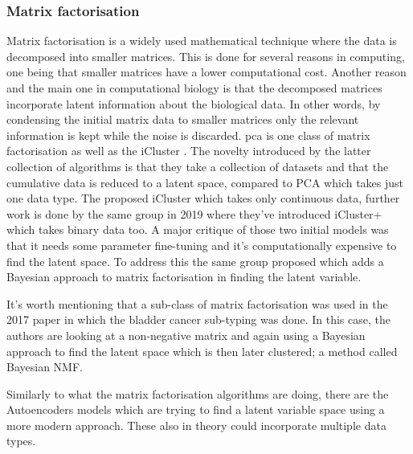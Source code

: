 \subsubsection{Matrix factorisation}
Matrix factorisation is a widely used mathematical technique where the data is decomposed into smaller matrices. This is done for several reasons in computing, one being that smaller matrices have a lower computational cost. Another reason and the main one in computational biology is that the decomposed matrices incorporate latent information about the biological data. In other words, by condensing the initial matrix data to smaller matrices only the relevant information is kept while the noise is discarded. \acrlong{pca} is one class of matrix factorisation as well as the iCluster \cite{Shen2009-ew, Mo2013-zi, Mo2018-el}. The novelty introduced by the latter collection of algorithms is that they take a collection of datasets and that the cumulative data is reduced to a latent space, compared to PCA which takes just one data type. The \citet{Shen2009-ew} proposed iCluster which takes only continuous data, further work is done by the same group in 2019 \citet{Mo2013-zi} where they've introduced iCluster+ which takes binary data too. A major critique of those two initial models was that it needs some parameter fine-tuning and it's computationally expensive to find the latent space. To address this the same group proposed \citet{Mo2018-el} which adds a Bayesian approach to matrix factorisation in finding the latent variable.

It's worth mentioning that a sub-class of matrix factorisation was used in the 2017 paper \citet{Robertson2017-mg} in which the bladder cancer sub-typing was done. In this case, the authors are looking at a non-negative matrix and again using a Bayesian approach to find the latent space which is then later clustered; a method called Bayesian NMF.

Similarly to what the matrix factorisation algorithms are doing, there are the Autoencoders models which are trying to find a latent variable space using a more modern approach. These also in theory could incorporate multiple data types.

\newpage

